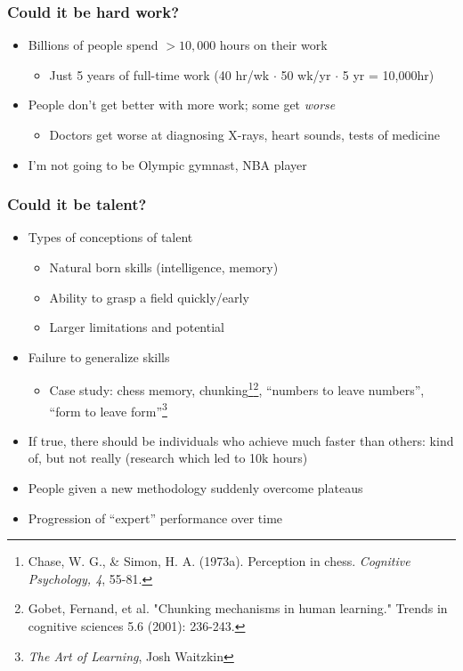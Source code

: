 \documentclass{beamer}
\begin{document}
\begin{frame}
  \frametitle{Could it be hard work?}
  \begin{itemize}
    \item Billions of people spend $>10,000$ hours on their work
      \begin{itemize}
        \item Just 5 years of full-time work (40 hr/wk $\cdot$ 50 wk/yr $\cdot$ 5 yr = 10,000hr)
      \end{itemize}
    \item People don't get better with more work; some get \textit{worse}
      \begin{itemize}
        \item Doctors get worse at diagnosing X-rays, heart sounds, tests of medicine
      \end{itemize}
    \item I'm not going to be Olympic gymnast, NBA player
  \end{itemize}
\end{frame}

\begin{frame}
  \frametitle{Could it be talent?}
  \begin{itemize}
    \item Types of conceptions of talent
      \begin{itemize}
        \item Natural born skills (intelligence, memory)
        \item Ability to grasp a field quickly/early
        \item Larger limitations and potential
      \end{itemize}
    \item Failure to generalize skills
      \begin{itemize}
        \item Case study: chess memory, chunking\footnote{Chase, W. G., & Simon, H. A. (1973a). Perception in chess. \textit{Cognitive
          Psychology, 4}, 55-81. }\footnote{Gobet, Fernand, et al. "Chunking mechanisms in human learning." Trends in cognitive sciences 5.6 (2001): 236-243.}, ``numbers to leave numbers'', ``form to leave form''\footnote{\textit{The Art of Learning}, Josh Waitzkin}
      \end{itemize}
    \item If true, there should be individuals who achieve much faster than others: kind of, but not really (research which led to 10k hours)
    \item People given a new methodology suddenly overcome plateaus
    \item Progression of ``expert'' performance over time
  \end{itemize}
\end{frame}
\end{document}
